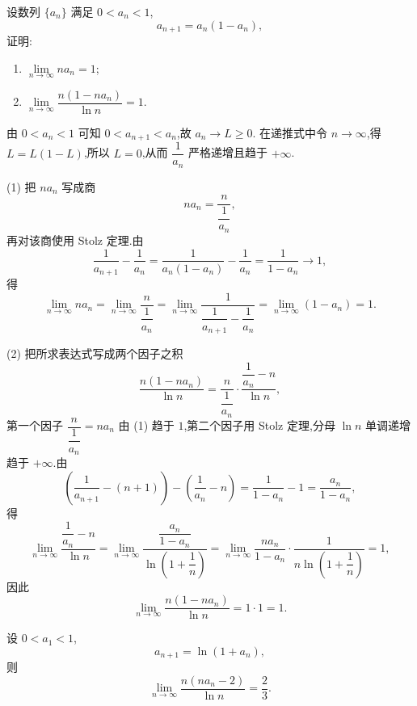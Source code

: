 \begin{example}
  设数列 $\{a_n\}$ 满足 $0<a_n<1$,
  \[
    a_{n+1}=a_n(1-a_n),
  \]
  证明:
  \begin{enumerate}
    \item $\displaystyle \lim\limits_{n\to\infty}na_n=1$;
    \item $\displaystyle \lim\limits_{n\to\infty}\dfrac{n(1-na_n)}{\ln n}=1$.
  \end{enumerate}
\end{example}
\exampleblank

\begin{solution}
  由 $0<a_n<1$ 可知 $0<a_{n+1}<a_n$,故 $a_n\to L\geq0$.
  在递推式中令 $n\to\infty$,得 $L=L(1-L)$,所以 $L=0$,从而 $\dfrac{1}{a_n}$
  严格递增且趋于 $+\infty$.

  (1) 把 $na_n$ 写成商
  \[
    na_n=\dfrac{n}{\dfrac{1}{a_n}},
  \]
  再对该商使用 Stolz 定理.由
  \[
    \dfrac{1}{a_{n+1}}-\dfrac{1}{a_n}
    =\dfrac{1}{a_n(1-a_n)}-\dfrac{1}{a_n}
    =\dfrac{1}{1-a_n}\longrightarrow1,
  \]
  得
  \[
    \displaystyle\lim\limits_{n\to\infty}na_n
    =\lim\limits_{n\to\infty}\dfrac{n}{\dfrac{1}{a_n}}
    =\lim\limits_{n\to\infty}
    \dfrac{1}{\dfrac{1}{a_{n+1}}-\dfrac{1}{a_n}}
    =\lim\limits_{n\to\infty}(1-a_n)=1.
  \]

  (2) 把所求表达式写成两个因子之积
  \[
    \dfrac{n(1-na_n)}{\ln n}
    =\dfrac{n}{\dfrac{1}{a_n}}\cdot
    \dfrac{\dfrac{1}{a_n}-n}{\ln n},
  \]
  第一个因子 $\dfrac{n}{\dfrac{1}{a_n}}=na_n$ 由 (1) 趋于 $1$,第二个因子用
  Stolz 定理,分母 $\ln n$ 单调递增趋于 $+\infty$.由
  \[
    \left(\dfrac{1}{a_{n+1}}-(n+1)\right)-\left(\dfrac{1}{a_n}-n\right)
    =\dfrac{1}{1-a_n}-1=\dfrac{a_n}{1-a_n},
  \]
  得
  \[
    \displaystyle\lim\limits_{n\to\infty}\dfrac{\dfrac{1}{a_n}-n}{\ln n}
    =\lim\limits_{n\to\infty}
    \dfrac{\dfrac{a_n}{1-a_n}}{\ln\left(1+\dfrac{1}{n}\right)}
    =\lim\limits_{n\to\infty}
    \dfrac{na_n}{1-a_n}\cdot\dfrac{1}{n\ln\left(1+\dfrac{1}{n}\right)}
    =1,
  \]
  因此
  \[
    \displaystyle\lim\limits_{n\to\infty}\dfrac{n(1-na_n)}{\ln n}=1\cdot1=1.
  \]
\end{solution}

\begin{example}
  设 $0<a_1<1$,
  \[
    a_{n+1}=\ln(1+a_n),
  \]
  则
  \[
    \displaystyle\lim\limits_{n\to\infty}\dfrac{n(na_n-2)}{\ln n}=\dfrac{2}{3}.
  \]
\end{example}
\exampleblank

